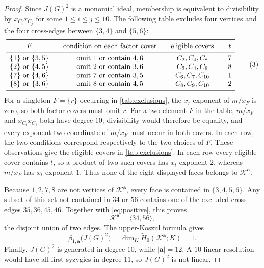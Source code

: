 \documentclass[11pt]{amsart}
\theoremstyle{remark}
\begin{document}
\begin{proof}
Since $J(G)^2$ is a monomial ideal, membership is equivalent to
divisibility by $x_{C_i}x_{C_j}$ for some
$1\leq i\leq j\leq10$.  The following table excludes four vertices
and the four cross-edges between $\{3,4\}$ and $\{5,6\}$:
\[
\begin{array}{c@{\qquad}c@{\qquad}c@{\qquad}c}
\toprule
F & \text{condition on each factor cover}
  & \text{eligible covers} & t\\
\midrule
\{1\}\ \text{or}\ \{3,5\}
  & \text{omit }1\ \text{or contain }4,6
  & C_2,C_4,C_8 & 7\\
\{2\}\ \text{or}\ \{4,5\}
  & \text{omit }2\ \text{or contain }3,6
  & C_3,C_4,C_6 & 8\\
\{7\}\ \text{or}\ \{4,6\}
  & \text{omit }7\ \text{or contain }3,5
  & C_6,C_7,C_{10} & 1\\
\{8\}\ \text{or}\ \{3,6\}
  & \text{omit }8\ \text{or contain }4,5
  & C_8,C_9,C_{10} & 2\\
\bottomrule
\end{array}
\tag{3}\label{tab:exclusions}
\]
For a singleton $F=\{r\}$ occurring in
\eqref{tab:exclusions}, the $x_r$-exponent of $m/x_F$ is zero, so both
factor covers must omit $r$.  For a two-element $F$ in the table,
$m/x_F$ and $x_{C_i}x_{C_j}$ both have degree $10$; divisibility would
therefore be equality, and every exponent-two coordinate of $m/x_F$
must occur in both covers.  In each row, the two conditions correspond
respectively to the two choices of $F$.  These observations give the
eligible covers in \eqref{tab:exclusions}.  In each row every eligible
cover contains $t$, so a product of two such covers has
$x_t$-exponent $2$, whereas $m/x_F$ has $x_t$-exponent $1$.  Thus none
of the eight displayed faces belongs to $\mathcal K^{\mathbf a}$.

Because $1,2,7,8$ are not vertices of $\mathcal K^{\mathbf a}$, every
face is contained in $\{3,4,5,6\}$.  Any subset of this set not
contained in $34$ or $56$ contains one of the excluded cross-edges
$35,36,45,46$.  Together with \eqref{eq:positive}, this proves
\[
\mathcal K^{\mathbf a}=\langle34,56\rangle,
\]
the disjoint union of two edges.  The upper-Koszul formula
\cite[Theorem~1.34]{MillerSturmfels} gives
\[
\beta_{1,\mathbf a}\bigl(J(G)^2\bigr)
 =\dim_K\widetilde H_0(\mathcal K^{\mathbf a};K)
 =1.
\]
Finally, $J(G)^2$ is generated in degree $10$, while
$|\mathbf a|=12$.  A $10$-linear resolution would have all first
syzygies in degree $11$, so $J(G)^2$ is not linear.
\end{proof}
\end{document}
